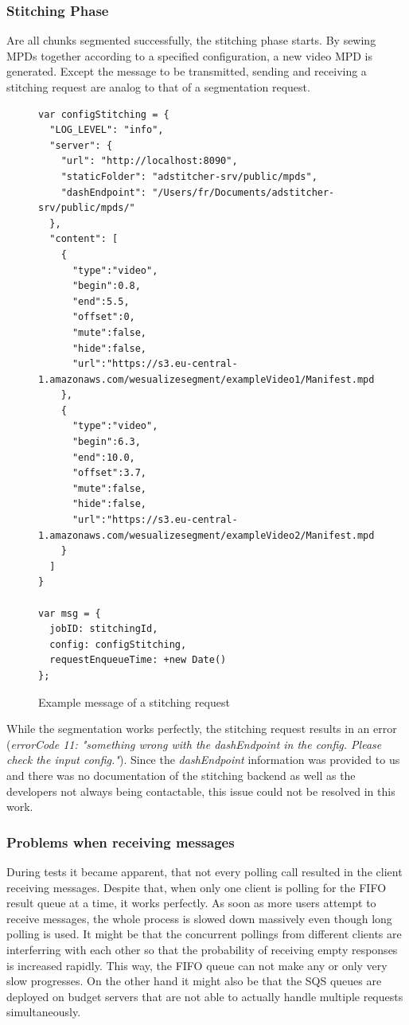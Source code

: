 \documentclass[conference]{IEEEtran}
\begin{document}
\subsubsection{Stitching Phase}
Are all chunks segmented successfully, the stitching phase starts.
By sewing MPDs together according to a specified configuration, a new video MPD is generated.
Except the message to be transmitted, sending and receiving a stitching request are analog to that of a segmentation request.
\begin{figure}[H]
\begin{lstlisting}
var configStitching = {
  "LOG_LEVEL": "info",
  "server": {
    "url": "http://localhost:8090",
    "staticFolder": "adstitcher-srv/public/mpds",
    "dashEndpoint": "/Users/fr/Documents/adstitcher-srv/public/mpds/"
  },
  "content": [
    {
      "type":"video",
      "begin":0.8,
      "end":5.5,
      "offset":0,
      "mute":false,
      "hide":false,
      "url":"https://s3.eu-central-1.amazonaws.com/wesualizesegment/exampleVideo1/Manifest.mpd"
    },
    {
      "type":"video",
      "begin":6.3,
      "end":10.0,
      "offset":3.7,
      "mute":false,
      "hide":false,
      "url":"https://s3.eu-central-1.amazonaws.com/wesualizesegment/exampleVideo2/Manifest.mpd"
    }
  ]
}

var msg = {
  jobID: stitchingId,
  config: configStitching,
  requestEnqueueTime: +new Date()
};
\end{lstlisting}
\caption{Example message of a stitching request}
\end{figure}
While the segmentation works perfectly, the stitching request results in an error (\textit{errorCode 11: "something wrong with the dashEndpoint in the config. Please check the input config."}).
Since the \textit{dashEndpoint} information was provided to us and there was no documentation of the stitching backend as well as the developers not always being contactable, this issue could not be resolved in this work.
\\
\subsubsection{Problems when receiving messages}
During tests it became apparent, that not every polling call resulted in the client receiving messages.
Despite that, when only one client is polling for the FIFO result queue at a time, it works perfectly.
As soon as more users attempt to receive messages, the whole process is slowed down massively even though long polling is used.
It might be that the concurrent pollings from different clients are interferring with each other so that the probability of receiving empty responses is increased rapidly.
This way, the FIFO queue can not make any or only very slow progresses.
On the other hand it might also be that the SQS queues are deployed on budget servers that are not able to actually handle multiple requests simultaneously.
\end{document}
